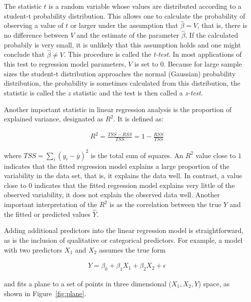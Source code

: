 The statistic $t$ is a random variable whose values are distributed according to a student-t probability distribution. This allows one to calculate the probability of observing a value of $t$ or larger under the assumption that $\hat{\beta} = V$, that is, there is no difference between $V$ and the estimate of the parameter $\hat{\beta}$. If the calculated probabily is very small, it is unlikely that this assumption holds and one might conclude that $\hat{\beta} \neq V$. This procedure is called the \emph{t-test}. In most applications of this test to regression model parameters, $V$ is set to $0$. Because for large sample sizes the student-t distribution approaches the normal (Gaussian) probability distribution, the probability is sometimes calculated from this distribution, the statistic is called the $z$ statistic and the test is then called a \emph{z-test}.

Another important statistic in linear regression analysis is the proportion of explained variance, designated as $R^2$. It is defined as:

\begin{align*}
R^2 = \frac{TSS - RSS}{TSS} = 1 - \frac{RSS}{TSS}
\end{align*}

\noindent where $TSS = \sum_i(y_i - \bar{y})^2$ is the total sum of squares. An $R^2$ value close to $1$ indicates that the fitted regression model explains a large proportion of the variability in the data set, that is, it explains the data well. In contrast, a value close to $0$ indicates that the fitted regression model explains very little of the observed variability, it does not explain the observed data well. Another important interpretation of the $R^2$ is as the correlation between the true $Y$ and the fitted or predicted values $\hat{Y}$.

Adding additional predictors into the linear regression model is straightforward, as is the inclusion of qualitative or categorical predictors. For example, a model with two predictors $X_1$ and $X_2$ assumes the true form

\begin{align*}
Y = \beta_0 + \beta_1 X_1 + \beta_2 X_2 + \epsilon
\end{align*}

\noindent and fits a plane to a set of points in three dimensional ($X_1, X_2, Y$) space, as shown in Figure~\ref{fig:plane}. 

